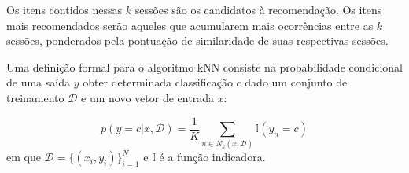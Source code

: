 Os itens contidos nessas $k$ sessões são os candidatos à recomendação. Os
itens mais recomendados serão aqueles que acumularem mais ocorrências entre as
$k$ sessões, ponderados pela pontuação de similaridade de suas
respectivas sessões.

Uma definição formal \cite{murphy} para o algoritmo kNN consiste na probabilidade
condicional de uma saída $y$ obter determinada classificação $c$ dado um conjunto
de treinamento $\mathcal{D}$ e um novo vetor de entrada $x$:

\begin{equation}
    p(y=c|x, \mathcal{D}) = \frac{1}{K} \sum_{n \in N_k (x, \mathcal{D})} \mathbb{I}(y_n = c)
\end{equation}
em que $\mathcal{D} = \{(x_i, y_i )\}^{N}_{i=1}$ e $\mathbb{I}$ é a função
indicadora.










